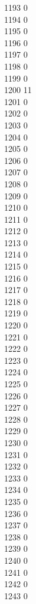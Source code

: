 { 1193	0 \\
 1194	0 \\
 1195	0 \\
 1196	0 \\
 1197	0 \\
 1198	0 \\
 1199	0 \\
 1200	11 \\
 1201	0 \\
 1202	0 \\
 1203	0 \\
 1204	0 \\
 1205	0 \\
 1206	0 \\
 1207	0 \\
 1208	0 \\
 1209	0 \\
 1210	0 \\
 1211	0 \\
 1212	0 \\
 1213	0 \\
 1214	0 \\
 1215	0 \\
 1216	0 \\
 1217	0 \\
 1218	0 \\
 1219	0 \\
 1220	0 \\
 1221	0 \\
 1222	0 \\
 1223	0 \\
 1224	0 \\
 1225	0 \\
 1226	0 \\
 1227	0 \\
 1228	0 \\
 1229	0 \\
 1230	0 \\
 1231	0 \\
 1232	0 \\
 1233	0 \\
 1234	0 \\
 1235	0 \\
 1236	0 \\
 1237	0 \\
 1238	0 \\
 1239	0 \\
 1240	0 \\
 1241	0 \\
 1242	0 \\
 1243	0 \\
}
